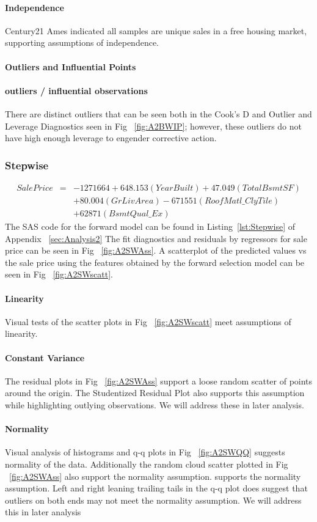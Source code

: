 \documentclass[11pt]{scrartcl} %
\begin{document}
\paragraph{Independence} Century21 Ames indicated all samples are unique sales in a free housing market, supporting assumptions of independence. 
\paragraph{Outliers and Influential Points}
\paragraph{outliers / influential observations} There are distinct outliers that can be seen both in the Cook's D and Outlier and Leverage Diagnostics seen in Fig ~\ref{fig:A2BWIP}; however, these outliers do not have high enough leverage to engender corrective action.

\subsubsection{Stepwise}
\begin{eqnarray*}
SalePrice &=& -1271664 + 648.153(YearBuilt) + 47.049(TotalBsmtSF) \\
& & + 80.004(GrLivArea) - 671551(RoofMatl\_ClyTile)\\
& & + 62871(BsmtQual\_Ex)
\end{eqnarray*}
The SAS code for the forward model can be found in Listing~\ref{lst:Stepwise} of Appendix ~\ref{sec:Analysis2}
The fit diagnostics and residuals by regressors for sale price can be seen in Fig ~\ref{fig:A2SWAss}. A scatterplot of the predicted values vs the sale price using the features obtained by the forward selection model can be seen in Fig ~\ref{fig:A2SWscatt}.
\paragraph{Linearity} Visual tests of the scatter plots in Fig ~\ref{fig:A2SWscatt} meet assumptions of linearity.
\paragraph{Constant Variance} The residual plots in Fig ~\ref{fig:A2SWAss} support a loose random scatter of points around the origin. The Studentized Residual Plot also supports this assumption while highlighting outlying observations. We will address these in later analysis.
\paragraph{Normality} Visual analysis of histograms and q-q plots in Fig ~\ref{fig:A2SWQQ} suggests normality of the data. Additionally the random cloud scatter plotted in Fig ~\ref{fig:A2SWAss} also support the normality assumption. supports the normality assumption. Left and right leaning trailing tails in the q-q plot does suggest that outliers on both ends may not meet the normality assumption. We will address this in later analysis
\end{document}
